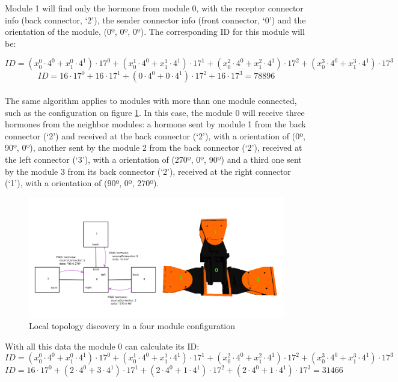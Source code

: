  Module 1 will find only the hormone from module 0, with the receptor connector info (back connector, `2'), the sender connector info (front connector, `0') and the orientation of the module, (0º, 0º, 0º). The corresponding ID for this module will be:

\[ ID = ( x_0^0 \cdot 4^0+ x_1^0 \cdot 4^1) \cdot 17^0 +
 ( x_0^1 \cdot 4^0+ x_1^1 \cdot 4^1) \cdot 17^1 +
  ( x_0^2 \cdot 4^0+ x_1^2 \cdot 4^1) \cdot 17^2 +
   ( x_0^3 \cdot 4^0+ x_1^3 \cdot 4^1) \cdot 17^3 \]
\[ ID = 16 \cdot 17^0 +
 16 \cdot 17^1 +
 ( 0 \cdot 4^0 + 0 \cdot 4^1 ) \cdot 17^2 +
 16 \cdot 17^3 = 78896 \]\\
 
The same algorithm applies to modules with more than one module connected, such as the configuration on figure \ref{fig:hormone_protocol_02}. In this case, the module 0 will receive three hormones from the neighbor modules: a hormone sent by module 1 from the back connector (`2') and received at the back connector (`2'), with a orientation of (0º, 90º, 0º), another sent by the module 2 from the back connector (`2'), received at the left connector (`3'), with a orientation of (270º, 0º, 90º) and a third one sent by the module 3 from its back connector (`2'), received at the right connector (`1'), with a orientation of (90º, 0º, 270º).\\
 
\begin{figure}[h]
	\centering
	\includegraphics[width=1\textwidth]{images/Hormone_protocol_02.png}
	\caption{Local topology discovery in a four module configuration}\label{fig:hormone_protocol_02}
\end{figure}

With all this data the module 0 can calculate its ID:
\[ ID = ( x_0^0 \cdot 4^0+ x_1^0 \cdot 4^1) \cdot 17^0 +
 ( x_0^1 \cdot 4^0+ x_1^1 \cdot 4^1) \cdot 17^1 +
  ( x_0^2 \cdot 4^0+ x_1^2 \cdot 4^1) \cdot 17^2 +
   ( x_0^3 \cdot 4^0+ x_1^3 \cdot 4^1) \cdot 17^3 \]
\[ ID = 
 16 \cdot 17^0 +
 ( 2 \cdot 4^0 + 3 \cdot 4^1 ) \cdot 17^1 +
 ( 2 \cdot 4^0 + 1 \cdot 4^1 ) \cdot 17^2 +
 ( 2 \cdot 4^0 + 1 \cdot 4^1 ) \cdot 17^3 = 31466 \]\\
 
